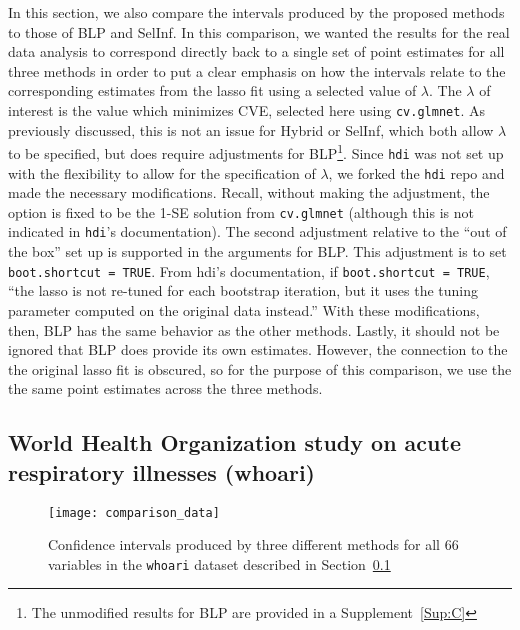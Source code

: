 In this section, we also compare the intervals produced by the proposed methods to those of BLP and SelInf. In this comparison, we wanted the results for the real data analysis to correspond directly back to a single set of point estimates for all three methods in order to put a clear emphasis on how the intervals relate to the corresponding estimates from the lasso fit using a selected value of $\lambda$. The $\lambda$ of interest is the value which minimizes CVE, selected here using \texttt{cv.glmnet}. As previously discussed, this is not an issue for Hybrid or SelInf, which both allow $\lambda$ to be specified, but does require adjustments for BLP\footnote{The unmodified results for BLP are provided in a Supplement~\ref{Sup:C}}. Since \texttt{hdi} was not set up with the flexibility to allow for the specification of $\lambda$, we forked the \texttt{hdi} repo and made the necessary modifications. Recall, without making the adjustment, the option is fixed to be the 1-SE solution from \texttt{cv.glmnet} (although this is not indicated in \texttt{hdi}'s documentation). The second adjustment relative to the ``out of the box'' set up is supported in the arguments for BLP. This adjustment is to set \texttt{boot.shortcut = TRUE}. From hdi's documentation, if \texttt{boot.shortcut = TRUE}, ``the lasso is not re-tuned for each bootstrap iteration, but it uses the tuning parameter computed on the original data instead.'' With these modifications, then, BLP has the same behavior as the other methods. Lastly, it should not be ignored that BLP does provide its own estimates. However, the connection to the the original lasso fit is obscured, so for the purpose of this comparison, we use the the same point estimates across the three methods.

\subsection{World Health Organization study on acute respiratory illnesses (whoari)}\label{Sec:whoari}

\begin{figure}[hbtp]
  \begin{center}
  \texttt{[image: comparison\_data]}
  \caption{\label{Fig:comparison_data_whoari} Confidence intervals produced by three different methods for all 66 variables in the \texttt{whoari} dataset described in Section~\ref{Sec:whoari}}
  \end{center}
\end{figure}

